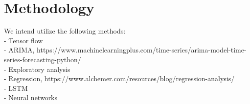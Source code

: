 \section{Methodology}

We intend utilize the following methods:\\
- Tensor flow \\
- ARIMA, https://www.machinelearningplus.com/time-series/arima-model-time-series-forecasting-python/ \\ 
- Exploratory analysis \\
- Regression, https://www.alchemer.com/resources/blog/regression-analysis/\\ 
- LSTM\\
- Neural networks